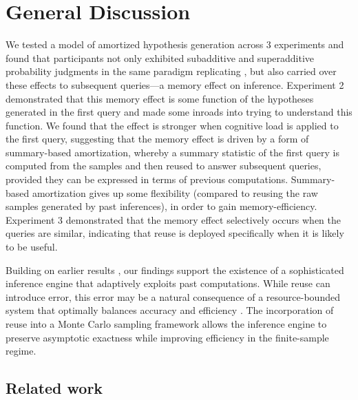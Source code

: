 \section{General Discussion}

We tested a model of amortized hypothesis generation across 3 experiments and found that participants not only exhibited subadditive and superadditive probability judgments in the same paradigm replicating \citet{dasgupta2017hypotheses}, but also carried over these effects to subsequent queries---a memory effect on inference. Experiment 2 demonstrated that this memory effect is some function of the hypotheses generated in the first query and made some inroads into trying to understand this function. We found that the effect is stronger when cognitive load is applied to the first query, suggesting that the memory effect is driven by a form of summary-based amortization, whereby a summary statistic of the first query is computed from the samples and then reused to answer subsequent queries, provided they can be expressed in terms of previous computations. Summary-based amortization gives up some flexibility (compared to reusing the raw samples generated by past inferences), in order to gain memory-efficiency. Experiment 3 demonstrated that the memory effect selectively occurs when the queries are similar, indicating that reuse is deployed specifically when it is likely to be useful.

Building on earlier results \citep{gershman2014amortized}, our findings support the existence of a sophisticated inference engine that adaptively exploits past computations. While reuse can introduce error, this error may be a natural consequence of a resource-bounded system that optimally balances accuracy and efficiency \citep{lieder2012burn,vul2014one,griffiths2015,gershman2015computational}. The incorporation of reuse into a Monte Carlo sampling framework allows the inference engine to preserve asymptotic exactness while improving efficiency in the finite-sample regime.

\subsection{Related work}

